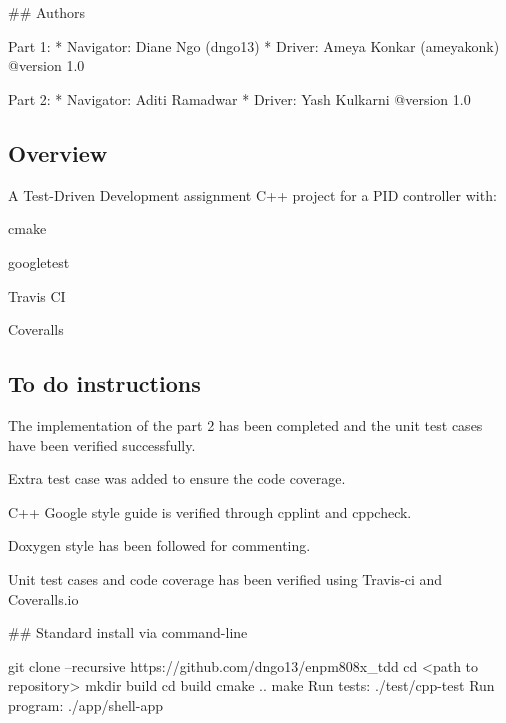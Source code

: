 \href{https://app.travis-ci.com/Ykulkarni-ops/enpm808x_tdd}{\tt } \section*{\href{https://coveralls.io/github/Ykulkarni-ops/enpm808x_tdd?branch=master}{\tt } }

\#\# Authors 
\begin{DoxyCode}
Part 1: 
* Navigator: Diane Ngo (dngo13)
* Driver: Ameya Konkar (ameyakonk)
@version 1.0
\end{DoxyCode}



\begin{DoxyCode}
Part 2: 
* Navigator: Aditi Ramadwar
* Driver: Yash Kulkarni
@version 1.0
\end{DoxyCode}
 \subsection*{Overview}

A Test-\/\+Driven Development assignment C++ project for a P\+ID controller with\+:


\begin{DoxyItemize}
\item cmake
\item googletest
\item Travis CI
\item Coveralls
\end{DoxyItemize}

\subsection*{To do instructions}


\begin{DoxyItemize}
\item The implementation of the part 2 has been completed and the unit test cases have been verified successfully.
\item Extra test case was added to ensure the code coverage.
\item C++ Google style guide is verified through cpplint and cppcheck.
\item Doxygen style has been followed for commenting.
\item Unit test cases and code coverage has been verified using Travis-\/ci and Coveralls.\+io
\end{DoxyItemize}

\#\# Standard install via command-\/line 
\begin{DoxyCode}
git clone --recursive https://github.com/dngo13/enpm808x\_tdd
cd <path to repository>
mkdir build
cd build
cmake ..
make
Run tests: ./test/cpp-test
Run program: ./app/shell-app
\end{DoxyCode}


